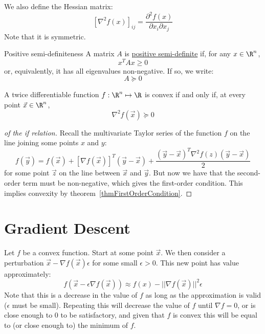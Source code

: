 \documentclass[../Main.tex]{subfiles}
\begin{document}
We also define the Hessian matrix:
\begin{equation}
    \left[\nabla^2 f(x)\right]_{ij} = \frac{\partial^2 f(x)}{\partial x_i \partial x_j}
    \label{eqnHessian}
\end{equation}
Note that it is symmetric.
\begin{definition}{Positive semi-definiteness}
    A matrix $A$ is \underline{positive semi-definite} if, for any $x \in \R^n$,
    \begin{equation}
        x^T A x \geq 0
        \label{eqnPositiveSemiDefinite}
    \end{equation}
    or, equivalently, it has all eigenvalues non-negative. If so, we write:
    \begin{equation*}
        A \succeq 0 
    \end{equation*}
\end{definition}
\begin{theorem}
    A twice differentiable function $f : \R^n \mapsto \R$ is convex if and only if, at every point $\vec{x} \in \R^n$,
    \begin{equation}
        \nabla^2 f(\vec{x}) \succeq 0
        \label{eqnSecondOrderCondition}
    \end{equation}
    \label{thmSecondOrderCondition}
\end{theorem}
\begin{proof}[of the if relation]
    Recall the multivariate Taylor series of the function $f$ on the line joining some points $x$ and $y$:
    \begin{equation*}
        f(\vec{y}) = f(\vec{x}) + [\nabla f(\vec{x})]^T (\vec{y} - \vec{x}) + \frac{(\vec{y} - \vec{x})^T \nabla^2 f(z) (\vec{y}-\vec{x})}{2}
    \end{equation*}
    for some point $\vec{z}$ on the line between $\vec{x}$ and $\vec{y}$. But now we have that the second-order term must be non-negative, which gives the first-order condition. This implies convexity by theorem~\ref{thmFirstOrderCondition}.
\end{proof}
\section{Gradient Descent}
Let $f$ be a convex function. Start at some point $\vec{x}$. We then consider a perturbation $\vec{x} - \nabla f(\vec{x}) \epsilon$ for some small $\epsilon > 0$. This new point has value approximately:
\begin{equation*}
    f(\vec{x} - \epsilon \nabla f(\vec{x})) \approx f(x) - ||\nabla f(\vec{x})||^2 \epsilon
\end{equation*}
Note that this is a decrease in the value of $f$ as long as the approximation is valid ($\epsilon$ must be small). Repeating this will decrease the value of $f$ until $\nabla f = 0$, or is close enough to $0$ to be satisfactory, and given that $f$ is convex this will be equal to (or close enough to) the minimum of $f$.
\end{document}
